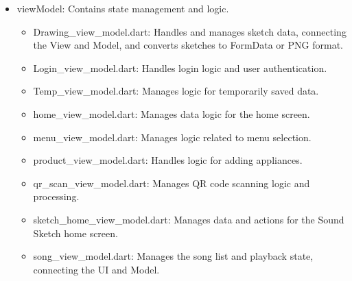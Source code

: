 \documentclass[conference]{IEEEtran}
\begin{document}
\begin{itemize}
\begin{itemize}
\item viewModel: Contains state management and logic.
\begin{itemize}
    \item Drawing\_view\_model.dart: Handles and manages sketch data, connecting the View and Model, and converts sketches to FormData or PNG format. \\
    \item Login\_view\_model.dart: Handles login logic and user authentication. \\
    \item Temp\_view\_model.dart: Manages logic for temporarily saved data. \\
    \item home\_view\_model.dart: Manages data logic for the home screen. \\
    \item menu\_view\_model.dart: Manages logic related to menu selection. \\
    \item product\_view\_model.dart: Handles logic for adding appliances. \\
    \item qr\_scan\_view\_model.dart: Manages QR code scanning logic and processing. \\
    \item sketch\_home\_view\_model.dart: Manages data and actions for the Sound Sketch home screen. \\
    \item song\_view\_model.dart: Manages the song list and playback state, connecting the UI and Model. \\
\end{itemize}
\end{itemize}
        \end{itemize}
\end{document}

